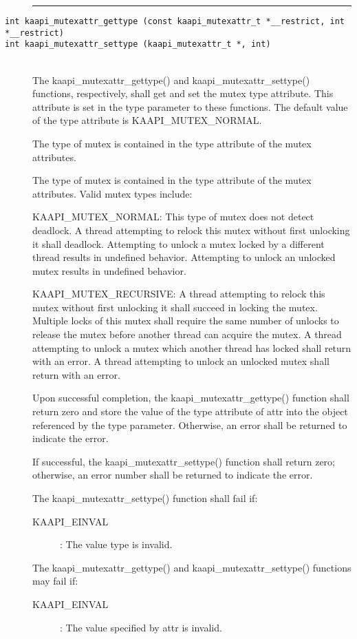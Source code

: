 \begin{description}
\vspace*{3ex} \hrule width 4cm
\vspace*{3ex} 
\item [\texttt{int kaapi\_mutexattr\_gettype (const kaapi\_mutexattr\_t
    *\_\_restrict, int *\_\_restrict)}]
\item [\texttt{int kaapi\_mutexattr\_settype (kaapi\_mutexattr\_t *, int)}]~\\

The kaapi\_mutexattr\_gettype() and kaapi\_mutexattr\_settype() functions,
respectively, shall get and set the mutex type attribute. This attribute is
set in the type parameter to these functions. The default value of the type
attribute is KAAPI\_MUTEX\_NORMAL.

The type of mutex is contained in the type attribute of the mutex attributes.

The type of mutex is contained in the type attribute of the mutex
attributes. Valid mutex types include:

KAAPI\_MUTEX\_NORMAL: This type of mutex does not detect deadlock. A thread
attempting to relock this mutex without first unlocking it shall
deadlock. Attempting to unlock a mutex locked by a different thread results in
undefined behavior. Attempting to unlock an unlocked mutex results in
undefined behavior.

KAAPI\_MUTEX\_RECURSIVE: A thread attempting to relock this mutex without
first unlocking it shall succeed in locking the mutex. Multiple locks of this
mutex shall require the same number of unlocks to release the mutex before
another thread can acquire the mutex. A thread attempting to unlock a mutex
which another thread has locked shall return with an error. A thread
attempting to unlock an unlocked mutex shall return with an error.

Upon successful completion, the kaapi\_mutexattr\_gettype() function shall
return zero and store the value of the type attribute of attr into the object
referenced by the type parameter. Otherwise, an error shall be returned to
indicate the error.

If successful, the kaapi\_mutexattr\_settype() function shall return zero;
otherwise, an error number shall be returned to indicate the error.

The kaapi\_mutexattr\_settype() function shall fail if:

\begin{description}
\item [KAAPI\_EINVAL]: The value type is invalid.
\end{description}

The kaapi\_mutexattr\_gettype() and kaapi\_mutexattr\_settype() functions may
fail if:

\begin{description}
\item [KAAPI\_EINVAL]: The value specified by attr is invalid.
\end{description}
\end{description}

